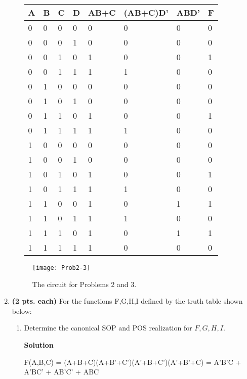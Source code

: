\begin{enumerate}
\begin{enumerate}
\begin{onlysolution}
	\begin{tabular}{l|l|l|l|l|l|l|l}
	 A &  B &  C &  D & AB+C  & (AB+C)D' & ABD'  &  F  \\ \hline
	 0 &  0 &  0 &  0 &  0 &  0 &  0 &  0  \\ \hline
	 0 &  0 &  0 &  1 &  0 &  0 &  0 &  0  \\ \hline
	 0 &  0 &  1 &  0 &  1 &  0 &  0 &  1  \\ \hline
	 0 &  0 &  1 &  1 &  1 &  1 &  0 &  0  \\ \hline
	 0 &  1 &  0 &  0 &  0 &  0 &  0 &  0  \\ \hline
	 0 &  1 &  0 &  1 &  0 &  0 &  0 &  0  \\ \hline
	 0 &  1 &  1 &  0 &  1 &  0 &  0 &  1  \\ \hline
	 0 &  1 &  1 &  1 &  1 &  1 &  0 &  0  \\ \hline
	 1 &  0 &  0 &  0 &  0 &  0 &  0 &  0  \\ \hline
	 1 &  0 &  0 &  1 &  0 &  0 &  0 &  0  \\ \hline
	 1 &  0 &  1 &  0 &  1 &  0 &  0 &  1  \\ \hline
	 1 &  0 &  1 &  1 &  1 &  1 &  0 &  0  \\ \hline
	 1 &  1 &  0 &  0 &  1 &  0 &  1 &  1  \\ \hline
	 1 &  1 &  0 &  1 &  1 &  1 &  0 &  0  \\ \hline
	 1 &  1 &  1 &  0 &  1 &  0 &  1 &  1  \\ \hline
	 1 &  1 &  1 &  1 &  1 &  0 &  0 &  0  \\ 
	\end{tabular}
\end{onlysolution}
\end{enumerate}
\begin{figure}[ht]
\texttt{[image: Prob2-3]}
\caption{The circuit for Problems 2 and 3.}
\label{fig:representationsHwCir2Bool}
\end{figure}

\item \textbf{ (2 pts. each)} For the functions F,G,H,I defined by the 
truth table shown below:
\begin{enumerate}
	\item Determine the canonical SOP and POS realization for $F,G,H,I$.

	\begin{onlysolution}  \textbf{Solution} \itshape
	
F(A,B,C) = (A+B+C)(A+B'+C')(A'+B+C')(A'+B'+C)  =
A'B'C + A'BC' + AB'C' + ABC \\


\end{onlysolution}
\end{enumerate}
\end{enumerate}
